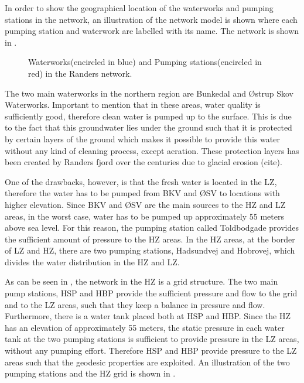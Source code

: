 In order to show the geographical location of the waterworks and pumping stations in the network, an illustration of the network model is shown where each pumping station and waterwork are labelled with its name. The network is shown in .

\begin{figure}[H]
\centering
 
\caption{Waterworks(encircled in blue) and Pumping stations(encircled in red) in the Randers network.}
\label{fig:pumping_stations_and_waterworks}
\end{figure}

The two main waterworks in the northern region are Bunkedal and Østrup Skov Waterworks. Important to mention that in these areas, water quality is sufficiently good, therefore clean water is pumped up to the surface. This is due to the fact that this groundwater lies under the ground such that it is protected by certain layers of the ground which makes it possible to provide this water without any kind of cleaning process, except aeration. These protection layers has been created by Randers fjord over the centuries due to glacial erosion (cite).

One of the drawbacks, however, is that the fresh water is located in the LZ, therefore the water has to be pumped from BKV and ØSV to locations with higher elevation. Since BKV and ØSV are the main sources to the HZ and LZ areas, in the worst case, water has to be pumped up approximately 55 meters above sea level. For this reason, the pumping station called Toldbodgade provides the sufficient amount of pressure to the HZ areas. In the HZ areas, at the border of LZ and HZ, there are two pumping stations, Hadsundvej and Hobrovej, which divides the water distribution in the HZ and LZ. 

As can be seen in , the network in the HZ is a grid structure. The two main pump stations, HSP and HBP provide the sufficient pressure and flow to the grid and to the LZ areas, such that they keep a balance in pressure and flow. Furthermore, there is a water tank placed both at HSP and HBP. Since the HZ has an elevation of approximately 55 meters, the static pressure in each water tank at the two pumping stations is sufficient to provide pressure in the LZ areas, without any pumping effort. Therefore HSP and HBP provide pressure to the LZ areas such that the geodesic properties are exploited. An illustration of the two pumping stations and the HZ grid is shown in . 

